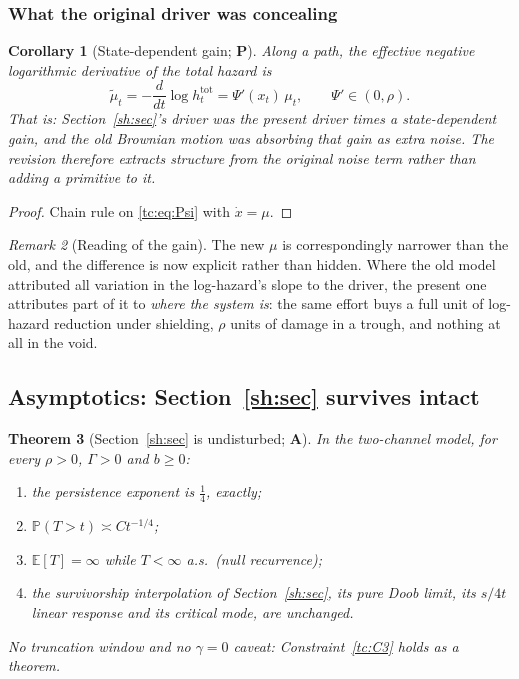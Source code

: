 \documentclass[11pt]{article}
\numberwithin{equation}{section}
\theoremstyle{plain}
\newtheorem{theorem}{Theorem}[section]
\newtheorem{corollary}[theorem]{Corollary}
\theoremstyle{definition}
\theoremstyle{remark}
\newtheorem{remark}[theorem]{Remark}
\newcommand{\E}{\mathbb{E}}
\newcommand{\PP}{\mathbb{P}}
\begin{document}
\subsubsection{What the original driver was concealing}
\label{tc:subsub:concealed}

\begin{corollary}[State-dependent gain; \textbf{P}]
\label{tc:cor:concealed}
Along a path, the effective negative logarithmic derivative of the total
hazard is
\begin{equation}\label{tc:eq:effmu}
\tilde\mu_t=-\frac{d}{dt}\log h^{\mathrm{tot}}_t
=\Psi'(x_t)\,\mu_t,
\qquad \Psi'\in(0,\rho).
\end{equation}
That is: \emph{Section~\ref{sh:sec}'s driver was the present driver times a
state-dependent gain}, and the old Brownian motion was absorbing that
gain as extra noise. The revision therefore extracts structure from the
original noise term rather than adding a primitive to it.
\end{corollary}

\begin{proof}
Chain rule on \eqref{tc:eq:Psi} with $\dot x=\mu$.
\end{proof}

\begin{remark}[Reading of the gain]\label{tc:rem:gainreading}
The new $\mu$ is correspondingly narrower than the old, and the
difference is now explicit rather than hidden. Where the old model
attributed all variation in the log-hazard's slope to the driver, the
present one attributes part of it to \emph{where the system is}: the
same effort buys a full unit of log-hazard reduction under shielding,
$\rho$ units of damage in a trough, and nothing at all in the void.
\end{remark}

\subsection{Asymptotics: Section~\ref{sh:sec} survives intact}
\label{tc:sub:asymptotics}

\begin{theorem}[Section~\ref{sh:sec} is undisturbed; \textbf{A}]
\label{tc:thm:survives}
In the two-channel model, for every $\rho>0$, $\Gamma>0$ and $b\ge0$:
\begin{enumerate}[label=\emph{(\roman*)},itemsep=1pt]
\item the persistence exponent is $\tfrac14$, exactly;
\item $\PP(T>t)\asymp Ct^{-1/4}$;
\item $\E[T]=\infty$ while $T<\infty$ a.s.\ (null recurrence);
\item the survivorship interpolation of Section~\ref{sh:sec}, its pure Doob
limit, its $s/4t$ linear response and its critical mode, are unchanged.
\end{enumerate}
\emph{No truncation window and no $\gamma=0$ caveat}:
Constraint~\ref{tc:C3} holds as a theorem.
\end{theorem}
\end{document}
